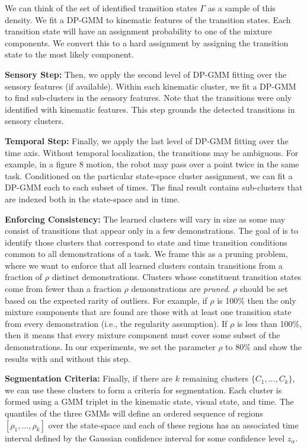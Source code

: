 We can think of the set of identified transition states $\Gamma$ as a sample of this density.
We fit a DP-GMM to kinematic features of the transition states.
Each transition state will have an assignment probability to one of the mixture components.
We convert this to a hard assignment by assigning the transition state to the most likely component.

\vspace{0.5em}\noindent\textbf{Sensory Step: }
Then, we apply the second level of DP-GMM fitting over the sensory features (if available).
Within each kinematic cluster, we fit a DP-GMM to find sub-clusters in the sensory features.
Note that the transitions were only identified with kinematic features.
This step grounds the detected transitions in sensory clusters.

\vspace{0.5em}\noindent\textbf{Temporal Step: }Finally, we apply the last level of DP-GMM fitting over the time axis.
Without temporal localization, the transitions may be ambiguous.
For example, in a figure 8 motion, the robot may pass over a point twice in the same task.
Conditioned on the particular state-space cluster assignment, we can fit a DP-GMM each to each subset of times.
The final result contains sub-clusters that are indexed both in the state-space and in time.

\vspace{0.5em}\noindent\textbf{Enforcing Consistency: }
The learned clusters will vary in size as some may consist of transitions that appear only in a few demonstrations. The goal of \tsc is to identify those clusters that correspond to state and time transition conditions common to all demonstrations of a task.
We frame this as a pruning problem, where we want to enforce that all learned clusters contain transitions from a fraction of $\rho$ distinct demonstrations.
Clusters whose constituent transition states come from fewer than a fraction $\rho$ demonstrations are \emph{pruned}.
$\rho$ should be set based on the expected rarity of outliers.
For example, if $\rho$ is 100\% then the only mixture components that are found are those with at least one transition state from every demonstration (i.e., the regularity assumption).
If $\rho$ is less than 100\%, then it means that every mixture component must cover some subset of the demonstrations.
In our experiments, we set the parameter $\rho$ to 80\% and show the results with and without this step.

\vspace{0.5em}\noindent\textbf{Segmentation Criteria: }
Finally, if there are $k$ remaining clusters $\{C_1,...,C_k\}$, we can use these clusters to form a criteria for segmentation. 
Each cluster is formed using a GMM triplet in the kinematic state, visual state, and time.
The quantiles of the three GMMs will define an ordered sequence of regions $[\rho_1,...,\rho_k]$ over the state-space and each of these regions has an associated time interval defined by the Gaussian confidence interval for some confidence level $z_{\alpha}$.


